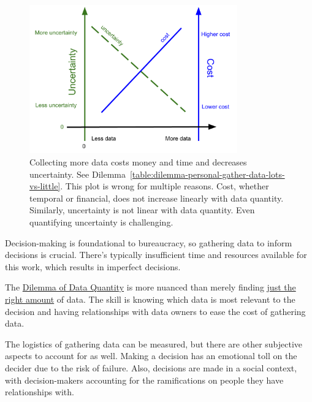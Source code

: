 \begin{figure}[H] %
        \centering
        \includegraphics[width=0.8\textwidth]{images/cost_and_uncertainty_for_data_collection}
        \caption{Collecting more data costs money and time and decreases uncertainty.  See Dilemma~\ref{table:dilemma-personal-gather-data-lots-vs-little}. This plot is wrong for multiple reasons. Cost, whether temporal or financial, does not increase linearly with data quantity. Similarly, uncertainty is not linear with data quantity. Even quantifying uncertainty is challenging. }
        \label{fig:data_collection_cost_uncertainty}
\end{figure}



Decision-making is foundational to bureaucracy, so gathering data to inform decisions is crucial. There's typically insufficient time and resources available for this work, which results in imperfect decisions. 

The \hyperref[table:dilemma-personal-gather-data-lots-vs-little]{Dilemma of Data Quantity} is more nuanced than merely finding 
\href{https://en.wikipedia.org/wiki/Goldilocks_principle}{just the right amount} of data.
\iftoggle{WPinmargin}{\marginpar{[Wikipedia] Goldilocks principle}}{}
The skill is knowing which data is most relevant to the decision and having relationships with data owners to ease the cost of gathering data.

The logistics of gathering data can be measured, but there are other subjective aspects to account for as well. Making a decision has an emotional toll on the decider due to the risk of failure. Also, decisions are made in a social context, with decision-makers accounting for the ramifications on people they have relationships with. 


